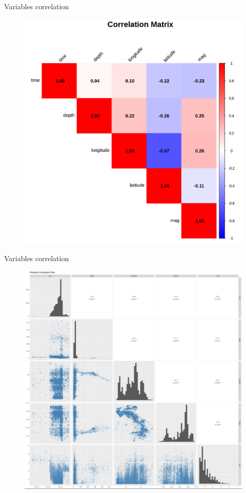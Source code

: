 \documentclass[aspectratio=43]{beamer}
\begin{document}
\begin{frame}{Variables correlation}
	\begin{figure}[t]
		\centering
		\includegraphics[width=0.77\textheight]{EQ_images_ben/eq_correlation_matrix.png}
	\end{figure}	
\end{frame}

\begin{frame}{Variables correlation}
	\begin{figure}[t]
		\centering
		\includegraphics[width=0.77\textheight]{EQ_images_ben/eq_correlation_plots.png}
	\end{figure}	
\end{frame}
\end{document}
